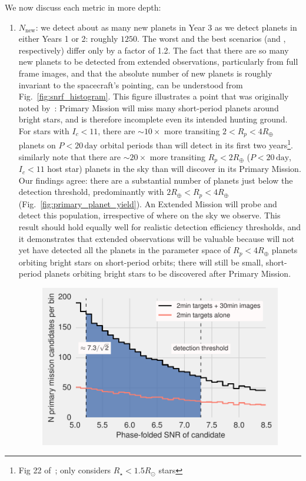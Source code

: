 We now discuss each metric in more depth:
\begin{enumerate}
	\item $N_\mathrm{new}$: we detect about as many new planets in Year 3 as we detect planets in either Years 1 or 2: roughly $1250$.
	The worst and the best scenarios (\elong\:and \hemis, respectively) differ only by a factor of 1.2.
	The fact that there are so many new planets to be detected from extended observations, particularly from full frame images, and that the absolute number of new planets is roughly invariant to the spacecraft's pointing, can be understood from Fig.~\ref{fig:snrf_histogram}.
	This figure illustrates a point that was originally noted by~:
        \tesss Primary Mission will miss many short-period planets around bright stars, and is therefore
        incomplete even its intended hunting ground.
        For stars with $I_c<11$, there are $\sim\! 10\times$ more transiting 
        $2<R_p<4R_\oplus$ planets on $P<20\,\mathrm{day}$ orbital periods than 
        \tess will detect in its first two years\footnote{Fig 22
        of~; only considers $R_\star<1.5R_\odot$ 
        stars}.
         similarly note that there are $\sim\! 
        20\times$ more transiting $R_p<2R_\oplus$ ($P<20\,\mathrm{day}$, 
        $I_c<11$ host star) planets in the sky than \tess will discover in 
        its Primary Mission.
	Our findings agree: there are a substantial number of planets just below the detection threshold, predominantly with $2R_\oplus < R_p <4R_\oplus$ (Fig.~\ref{fig:primary_planet_yield}).
	An Extended Mission will probe and detect this population, irrespective of where on the sky we observe.
	This result should hold equally well for realistic detection efficiency 
	thresholds, and it demonstrates that extended observations will be valuable 
	because \tess will not yet have detected all the planets in the parameter 
	space of $R_p<4R_\oplus$ planets orbiting bright stars on short-period 
	orbits;
	there will still be small, short-period planets orbiting bright stars to 
	be discovered after \tesss Primary Mission.
\begin{figure}[!t]
	\centering
	\includegraphics[scale=1.]{figures/snrf_histogram_with_ps.pdf}

\end{figure}
\end{enumerate}
